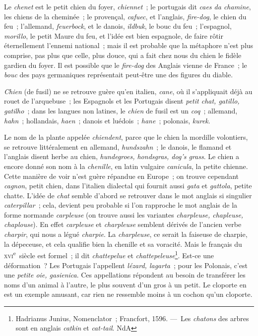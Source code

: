 \documentclass[french,twoside]{book} %
\begin{document}
\noindent Le {\itshape chenet} est le petit chien du foyer, {\itshape chiennet} ; le portugais dit {\itshape caes da chamine}, les chiens de la cheminée ; le provençal, {\itshape cafuec}, et l’anglais, {\itshape fire-dog}, le chien du feu ; l’allemand, {\itshape feuerbock}, et le danois, {\itshape ildbuk}, le bouc du feu ; l’espagnol, {\itshape morillo}, le petit Maure du feu, et l’idée est bien espagnole, de faire rôtir éternellement l’ennemi national ; mais il est probable que la métaphore n’est plus comprise, pas plus que celle, plus douce, qui a fait chez nous du chien le fidèle gardien du foyer. Il est possible que le {\itshape fire-dog} des Anglais vienne de France ; le {\itshape bouc} des pays germaniques représentait peut-être une des figures du diable.\par
{\itshape Chien} (de fusil) ne se retrouve guère qu’en italien, {\itshape cane}, où il s’appliquait déjà au rouet de l’arquebuse ; les Espagnols et les Portugais disent {\itshape petit chat, gatillo, gatilho} ; dans les langues non latines, le {\itshape chien} de fusil est un {\itshape coq} ; allemand, {\itshape hahn} ; hollandais, {\itshape haen} ; danois et luédois ; {\itshape hane} ; polonais, {\itshape kurek}.\par
Le nom de la plante appelée {\itshape chiendent}, parce que le chien la mordille volontiers, se retrouve littéralement en allemand, {\itshape hundszahn} ; le danois, le flamand et l’anglais disent herbe au chien, {\itshape hundegroes, hondsgras, dog’s grass}. Le chien a encore donné son nom à la {\itshape chenille}, en latin vulgaire {\itshape canicula}, la petite chienne. Cette manière de voir n’est guère répandue en Europe ; on trouve cependant {\itshape cagnon}, petit chien, dans l’italien dialectal qui fournit aussi {\itshape gata} et {\itshape gattola}, petite chatte. L’idée de {\itshape chat} semble d’abord se retrouver dans le mot anglais si singulier {\itshape caterpillar} ; cela, devient peu probable si l’on rapproche le mot anglais de la forme normande {\itshape carpleuse} (on trouve aussi les variantes {\itshape charpleuse, chapleuse, chaplouse}). En effet {\itshape carpleuse} et {\itshape charpleuse} semblent dérivés de l’ancien verbe {\itshape charpir}, qui nous a légué {\itshape charpie}. La {\itshape charpleuse}, ce serait la faiseuse de charpie, la dépeceuse, et cela qualifie bien la chenille et sa voracité. Mais le français du \textsc{xvi}\textsuperscript{e} siècle est formel ; il dit {\itshape chattepelue} et {\itshape chattepeleuse}\footnote{ Hadrianus Junius, Nomenclator ; Francfort, 1596. — Les {\itshape chatons} des arbres sont en anglais {\itshape catkin} et {\itshape cat-tail}. NdA}. Est-ce une déformation ? Les Portugais l’appellent {\itshape lézard, lagarta} ; pour les Polonais, c’est une {\itshape petite oie, gasienica}. Ces appellations répondent au besoin de transférer les noms d’un animal à l’autre, le plus souvent d’un gros à un petit. Le cloporte en est un exemple amusant, car rien ne ressemble moins à un cochon qu’un cloporte.\par
\end{document}
